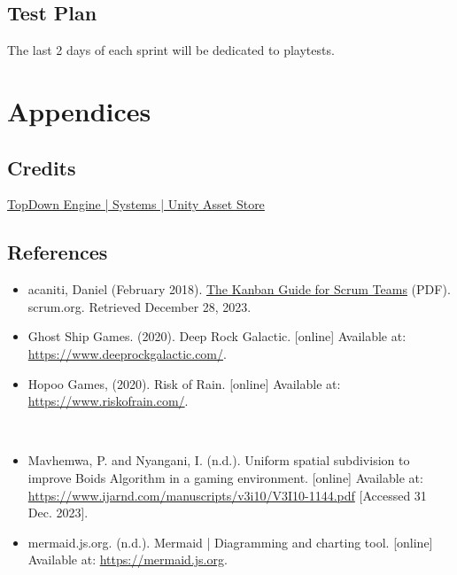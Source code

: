 \documentclass{article}
\begin{document}
\subsection{Test Plan}
\label{sec:org3d214dc}
The last 2 days of each sprint will be dedicated to playtests.
\section{Appendices}
\label{sec:org006a716}
\subsection{Credits}
\label{sec:orge07d348}
\href{https://assetstore.unity.com/packages/templates/systems/topdown-engine-89636}{TopDown Engine | Systems | Unity Asset Store}
\subsection{References}
\label{sec:org5491fcf}


\begin{itemize}
\item acaniti, Daniel (February 2018). \href{https://scrumorg-website-prod.s3.amazonaws.com/drupal/2018-02/2018\%20Kanban\%20Guide\%20for\%20Scrum\%20Teams\_0.pdf}{The Kanban Guide for Scrum Teams} (PDF). scrum.org. Retrieved December 28, 2023.
\end{itemize}


\begin{itemize}
\item Ghost Ship Games. (2020). Deep Rock Galactic. [online] Available at: \url{https://www.deeprockgalactic.com/}.
\end{itemize}


\begin{itemize}
\item Hopoo Games, (2020). Risk of Rain. [online] Available at: \url{https://www.riskofrain.com/}.
\end{itemize}
‌

\begin{itemize}
\item Mavhemwa, P. and Nyangani, I. (n.d.). Uniform spatial subdivision to improve Boids Algorithm in a gaming environment. [online] Available at: \url{https://www.ijarnd.com/manuscripts/v3i10/V3I10-1144.pdf} [Accessed 31 Dec. 2023].
\end{itemize}


\begin{itemize}
\item mermaid.js.org. (n.d.). Mermaid | Diagramming and charting tool. [online] Available at: \url{https://mermaid.js.org}.
\end{itemize}
\end{document}
